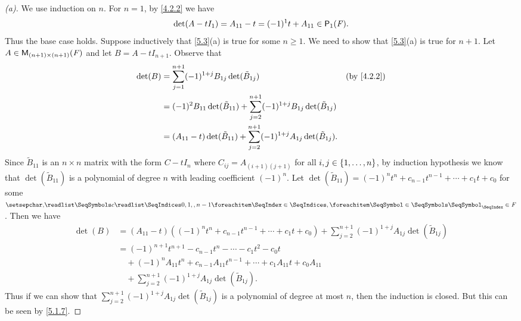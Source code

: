 \begin{proof}[(a)]
  We use induction on \(n\).
  For \(n = 1\), by \cref{4.2.2} we have
  \[
    \det(A - t I_1) = A_{1 1} - t = (-1)^1 t + A_{1 1} \in \ps[1]{\F}.
  \]
  Thus the base case holds.
  Suppose inductively that \cref{5.3}(a) is true for some \(n \geq 1\).
  We need to show that \cref{5.3}(a) is true for \(n + 1\).
  Let \(A \in \mathsf{M}_{{(n + 1)} \times (n + 1)}({\mathit{F}})\) and let \(B = A - t I_{n + 1}\).
  Observe that
  \begin{align*}
    \det(B) & = \sum_{j = 1}^{n + 1} (-1)^{1 + j} B_{1 j} \det(\tilde{B}_{1 j})                                          &  & \text{(by \cref{4.2.2})} \\
            & = (-1)^{2} B_{1 1} \det(\tilde{B}_{1 1}) + \sum_{j = 2}^{n + 1} (-1)^{1 + j} B_{1 j} \det(\tilde{B}_{1 j})                               \\
            & = (A_{1 1} - t) \det(\tilde{B}_{1 1}) + \sum_{j = 2}^{n + 1} (-1)^{1 + j} A_{1 j} \det(\tilde{B}_{1 j}).
  \end{align*}
  Since \(\tilde{B}_{1 1}\) is an \(n \times n\) matrix with the form \(C - t I_n\) where \(C_{i j} = A_{(i + 1) (j + 1)}\) for all \(i, j \in \left\lbrace1, \dots, n\right\rbrace\), by induction hypothesis we know that \(\det(\tilde{B}_{1 1})\) is a polynomial of degree \(n\) with leading coefficient \((-1)^n\).
  Let \(\det(\tilde{B}_{1 1}) = (-1)^n t^n + c_{n - 1} t^{n - 1} + \cdots + c_1 t + c_0\) for some \(\seq{c}{0,1,,n-1} \in \F\).
  Then we have
  \begin{align*}
    \det(B) & = (A_{1 1} - t) ((-1)^{n} t^n + c_{n - 1} t^{n - 1} + \cdots + c_1 t + c_0) + \sum_{j = 2}^{n + 1} (-1)^{1 + j} A_{1 j} \det(\tilde{B}_{1 j}) \\
            & = (-1)^{n + 1} t^{n + 1} - c_{n - 1} t^n - \cdots - c_1 t^2 - c_0 t                                                                           \\
            & \quad + (-1)^n A_{1 1} t^n + c_{n - 1} A_{1 1} t^{n - 1} + \cdots + c_1 A_{1 1} t + c_0 A_{1 1}                                               \\
            & \quad + \sum_{j = 2}^{n + 1} (-1)^{1 + j} A_{1 j} \det(\tilde{B}_{1 j}).
  \end{align*}
  Thus if we can show that \(\sum_{j = 2}^{n + 1} (-1)^{1 + j} A_{1 j} \det(\tilde{B}_{1 j})\) is a polynomial of degree at most \(n\), then the induction is closed.
  But this can be seen by \cref{5.1.7}.
\end{proof}

